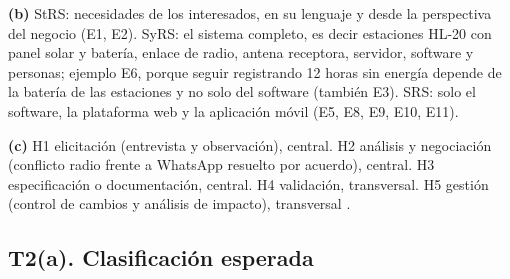 \documentclass[11pt]{article}
\newcommand{\subseccion}[1]{\subsection{\textcolor{midblue}{#1}}}
\begin{document}
	\textbf{(b)} StRS: necesidades de los interesados, en su lenguaje y desde la perspectiva del negocio (E1, E2). SyRS: el sistema completo, es decir estaciones HL-20 con panel solar y batería, enlace de radio, antena receptora, servidor, software y personas; ejemplo E6, porque seguir registrando 12 horas sin energía depende de la batería de las estaciones y no solo del software (también E3). SRS: solo el software, la plataforma web y la aplicación móvil (E5, E8, E9, E10, E11).
	
	\textbf{(c)} H1 elicitación (entrevista y observación), central. H2 análisis y negociación (conflicto radio frente a WhatsApp resuelto por acuerdo), central. H3 especificación o documentación, central. H4 validación, transversal. H5 gestión (control de cambios y análisis de impacto), transversal \citep{pohl_2025}.
	
	\subseccion{T2(a). Clasificación esperada}
	
\end{document}
